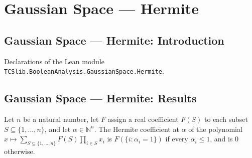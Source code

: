 \section{Gaussian Space --- Hermite}
\subsection*{Gaussian Space --- Hermite: Introduction}

Declarations of the Lean module \texttt{TCSlib.BooleanAnalysis.GaussianSpace.Hermite}.

\subsection*{Gaussian Space --- Hermite: Results}

\begin{theorem}
\label{BooleanAnalysis.GaussianSpace.hermiteCoeff_multilinear}
\leanok
{}
Let $n$ be a natural number, let $F$ assign a real coefficient $F(S)$ to each subset
$S\subseteq\{1,\ldots,n\}$, and let $\alpha\in\mathbb N^n$. The Hermite coefficient at
$\alpha$ of the polynomial $x\mapsto\sum_{S\subseteq\{1,\ldots,n\}}F(S)\prod_{i\in
S}x_i$ is $F(\{i:\alpha_i=1\})$ if every $\alpha_i\le 1$, and is $0$ otherwise.
\end{theorem}
